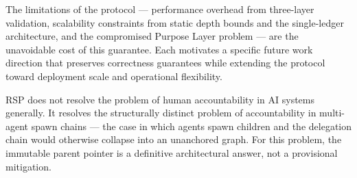 The limitations of the protocol — performance overhead from three-layer validation, scalability constraints from static depth bounds and the single-ledger architecture, and the compromised Purpose Layer problem — are the unavoidable cost of this guarantee. Each motivates a specific future work direction that preserves correctness guarantees while extending the protocol toward deployment scale and operational flexibility.

RSP does not resolve the problem of human accountability in AI systems generally. It resolves the structurally distinct problem of accountability in multi-agent spawn chains — the case in which agents spawn children and the delegation chain would otherwise collapse into an unanchored graph. For this problem, the immutable parent pointer is a definitive architectural answer, not a provisional mitigation.
